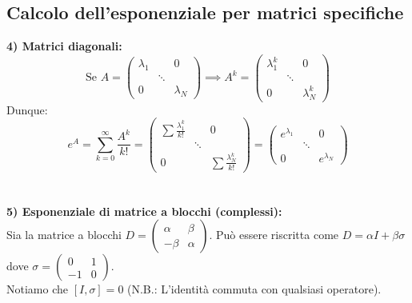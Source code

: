 \documentclass[openany]{book}
\theoremstyle{definition}
\theoremstyle{remark}
\begin{document}
\vspace{0.5cm}
\subsection*{Calcolo dell'esponenziale per matrici specifiche}

\textbf{4) Matrici diagonali:}
\begin{equation*}
    \text{Se } A = \begin{pmatrix} \lambda_1 & & 0 \\ & \ddots & \\ 0 & & \lambda_N \end{pmatrix} \implies A^k = \begin{pmatrix} \lambda_1^k & & 0 \\ & \ddots & \\ 0 & & \lambda_N^k \end{pmatrix}
\end{equation*}
Dunque:
\begin{equation*}
    e^A = \sum_{k=0}^{\infty} \frac{A^k}{k!} = \begin{pmatrix} \sum \frac{\lambda_1^k}{k!} & & 0 \\ & \ddots & \\ 0 & & \sum \frac{\lambda_N^k}{k!} \end{pmatrix} = \begin{pmatrix} e^{\lambda_1} & & 0 \\ & \ddots & \\ 0 & & e^{\lambda_N} \end{pmatrix}
\end{equation*}
\\
\\
\vspace{0.3cm}
\textbf{5) Esponenziale di matrice a blocchi (complessi):} \\
Sia la matrice a blocchi $D = \begin{pmatrix} \alpha & \beta \\ -\beta & \alpha \end{pmatrix}$. Può essere riscritta come $D = \alpha I + \beta \sigma$ dove $\sigma = \begin{pmatrix} 0 & 1 \\ -1 & 0 \end{pmatrix}$. \\
Notiamo che $[I, \sigma] = 0$ (N.B.: L'identità commuta con qualsiasi operatore).
\end{document}
